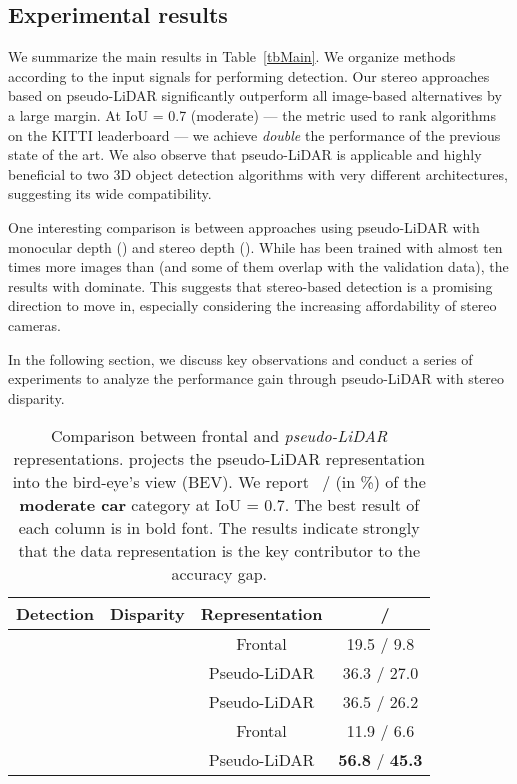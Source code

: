 \subsection{Experimental results}
\label{exp_result}


We summarize the main results in Table~\ref{tbMain}. We organize methods according to the input signals for performing detection. Our stereo approaches based on pseudo-LiDAR significantly outperform all image-based alternatives by a large margin. At IoU = 0.7 (moderate) --- the metric used to rank algorithms on the KITTI leaderboard --- we achieve \emph{double} the performance of the previous state of the art. We also observe that pseudo-LiDAR is applicable and highly beneficial to two 3D object detection algorithms with very different architectures, suggesting its wide compatibility.

One interesting comparison is between approaches using pseudo-LiDAR with monocular depth (\DORN) and stereo depth (\PSMNetpd). While \DORN has been trained with almost ten times more images than \PSMNetpd (and some of them overlap with the validation data), the results with \PSMNetpd dominate. This suggests that stereo-based detection is a promising direction to move in, especially considering the increasing affordability of stereo cameras.

In the following section, we discuss key observations and conduct a series of experiments to analyze the performance gain through pseudo-LiDAR with stereo disparity.

\begin{table}
	\centering
	\tabcolsep 3pt
	\caption{\small Comparison between frontal and \emph{pseudo-LiDAR} representations. \AVOD projects the pseudo-LiDAR representation into the bird-eye's view (BEV). We report \APBEV ~/ \AP (in \%) of the \textbf{moderate car} category at IoU = 0.7. The best result of each column is in bold font. The results indicate strongly  that the data representation is the key  contributor to the accuracy gap. } \label{tbAVOD}
	\begin{tabular}{l|l|c|c}
		\multicolumn{1}{c|}{Detection} & \multicolumn{1}{c|}{Disparity} & Representation & \APBEV~/ \AP \\ \hline
		\MLF~\cite{xu2018multi} & \DispNet & Frontal & 19.5 / 9.8 \\
		\color{blue}\AVODGT &\color{blue} \DispNetS &\color{blue} Pseudo-LiDAR & \color{blue}36.3 / 27.0 \\
		\color{blue}\AVODGT &\color{blue} \DispNetC &\color{blue} Pseudo-LiDAR & \color{blue}36.5 / 26.2 \\ \hline
		\AVODGT & \PSMNetpd & Frontal & 11.9 / 6.6 \\
		\color{blue}\AVODGT &\color{blue} \PSMNetpd &\color{blue} Pseudo-LiDAR & \color{blue}\textbf{56.8} / \textbf{45.3} \\
		\hline
	\end{tabular}
\end{table} 

